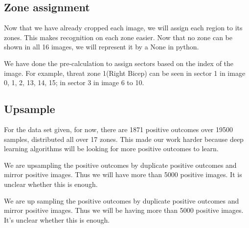 \documentclass[conference,compsoc]{IEEEtran}
\begin{document}
\subsection{Zone assignment}
Now that we have already cropped each image, we will assign each region to its zones. This makes recognition on each zone easier. Now that no zone can be shown in all 16 images, we will represent it by a None in python.

We have done the pre-calculation to assign sectors based on the index of the image. For example, threat zone 1(Right Bicep) can be seen in sector 1 in image 0, 1, 2, 13, 14, 15; in sector 3 in image 6 to 10.

\subsection{Upsample}
For the data set given, for now, there are 1871 positive outcomes over 19500 samples, distributed all over 17 zones. This made our work harder because deep learning algorithms will be looking for more positive outcomes to learn.

We are upsampling the positive outcomes by duplicate positive outcomes and mirror positive images. Thus we will have more than 5000 positive images. It is unclear whether this is enough.

We are up sampling the positive outcomes by duplicate positive outcomes and mirror positive images. Thus we will be having more than 5000 positive images. It's unclear whether this is enough.
        


\end{document}
